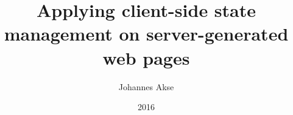 \documentclass[english]{ifimaster}
\title{Applying client-side state management on server-generated web pages}
\author{Johannes Akse}
\date{2016}
\begin{document}
\ififorside
\maketitle{}





\end{document}
